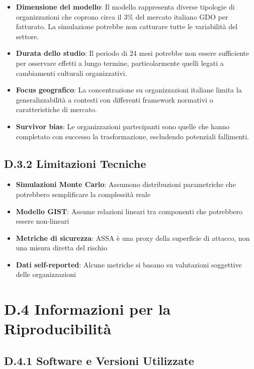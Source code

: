 \begin{itemize}
    \item \textbf{Dimensione del modello}: Il modello rappresenta diverse tipologie di organizzazioni che coprono circa il 3\% del mercato italiano GDO per fatturato. La simulazione potrebbe non catturare tutte le variabilità del settore.
    
    \item \textbf{Durata dello studio}: Il periodo di 24 mesi potrebbe non essere sufficiente per osservare effetti a lungo termine, particolarmente quelli legati a cambiamenti culturali organizzativi.
    
    \item \textbf{Focus geografico}: La concentrazione su organizzazioni italiane limita la generalizzabilità a contesti con differenti framework normativi o caratteristiche di mercato.
    
    \item \textbf{Survivor bias}: Le organizzazioni partecipanti sono quelle che hanno completato con successo la trasformazione, escludendo potenziali fallimenti.
\end{itemize}

\subsection{D.3.2 Limitazioni Tecniche}

\begin{itemize}
    \item \textbf{Simulazioni Monte Carlo}: Assumono distribuzioni parametriche che potrebbero semplificare la complessità reale
    \item \textbf{Modello GIST}: Assume relazioni lineari tra componenti che potrebbero essere non-lineari
    \item \textbf{Metriche di sicurezza}: ASSA è una proxy della superficie di attacco, non una misura diretta del rischio
    \item \textbf{Dati self-reported}: Alcune metriche si basano su valutazioni soggettive delle organizzazioni
\end{itemize}

\section{D.4 Informazioni per la Riproducibilità}

\subsection{D.4.1 Software e Versioni Utilizzate}

